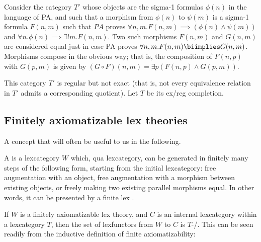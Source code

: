 \begin{construction}
Consider the category $T'$ whose objects are the sigma-1 formulas $\phi(n)$ in the language of PA, and such that a morphism from $\phi(n)$ to $\psi(m)$ is a sigma-1 formula $F(n, m)$ such that $PA$ proves $\forall n, m . F(n, m) \implies (\phi(n) \wedge \psi(m))$ and $\forall n . \phi(n) \implies \exists! m . F(n, m)$. Two such morphisms $F(n, m)$ and $G(n, m)$ are considered equal just in case PA proves $\forall n, m . F(n, m) \biimplies G(n, m)$. Morphisms compose in the obvious way; that is, the composition of $F(n, p)$ with $G(p, m)$ is given by $(G \circ F)(n, m) = \exists p (F(n, p) \wedge G(p, m))$.

This category $T'$ is regular but not exact (that is, not every equivalence relation in $T'$ admits a corresponding quotient). Let $T$ be its ex/reg completion.

\end{construction}


\subsection{Finitely axiomatizable lex theories}
A concept that will often be useful to us in the following.

\begin{definition}
A  is a lexcategory $W$ which, qua lexcategory, can be generated in finitely many steps of the following form, starting from the initial lexcategory: free augmentation with an object, free augmentation with a morphism between existing objects, or freely making two existing parallel morphisms equal. In other words, it can be presented by a finite lex .
\end{definition}

If $W$ is a finitely axiomatizable lex theory, and $C$ is an internal lexcategory within a lexcategory $T$, then the set of lexfunctors from $W$ to $C$ is $T$-\repsmall/. This can be seen readily from the inductive definition of finite axiomatizability: 

